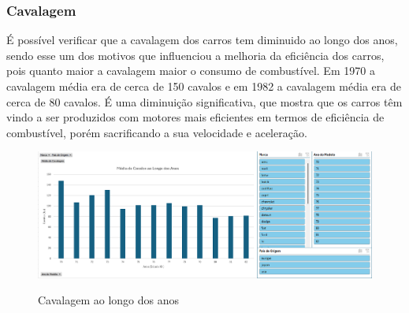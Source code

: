 \documentclass[a4paper]{article}
\begin{document}

\subsubsection{Cavalagem}
É possível verificar que a cavalagem dos carros tem diminuido ao longo dos anos, sendo esse um dos motivos
que influenciou a melhoria da eficiência dos carros, pois quanto maior a cavalagem maior o consumo de combustível.
Em 1970 a cavalagem média era de cerca de 150 cavalos e em 1982 a cavalagem média era de cerca de 80 cavalos.
É uma diminuição significativa, que mostra que os carros têm vindo a ser produzidos com motores mais eficientes em termos
de eficiência de combustível, porém sacrificando a sua velocidade e aceleração.

\begin{figure}[h!]
    \centering
    \includegraphics[width=1\textwidth]{Recursos/CavalagemGrafico.png} %
    \vspace{0.5cm}
    \label{fig:cavg}
    \caption{Cavalagem ao longo dos anos}
\end{figure}

\newpage
\end{document}
